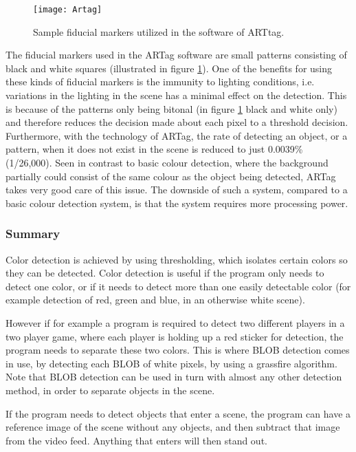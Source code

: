 \begin{figure}[!htbp]
\centering
\texttt{[image: Artag]}
\caption{Sample fiducial markers utilized in the software of ARTtag. \parencite{Fiala2005}}
\label{fig:artag}
\end{figure}

The fiducial markers used in the ARTag software are small patterns consisting of black and white squares (illustrated in figure \ref{fig:artag}).
One of the benefits for using these kinds of fiducial markers is the immunity to lighting conditions, i.e. variations in the lighting in the scene has a minimal effect on the detection. This is because of the patterns only being bitonal (in figure \ref{fig:artag} black and white only) and therefore reduces the decision made about each pixel to a threshold decision. 
Furthermore, with the technology of ARTag, the rate of detecting an object, or a pattern, when it does not exist in the scene is reduced to just 0.0039\% (1/26,000).
Seen in contrast to basic colour detection, where the background partially could consist of the same colour as the object being detected, ARTag takes very good care of this issue. The downside of such a system, compared to a basic colour detection system, is that the system requires more processing power.


\subsubsection{Summary}
Color detection is achieved by using thresholding, which isolates certain colors so they can be detected. Color detection is useful if the program only needs to detect one color, or if it needs to detect more than one easily detectable color (for example detection of red, green and blue, in an otherwise white scene).

However if for example a program is required to detect two different players in a two player game, where each player is holding up a red sticker for detection, the program needs to separate these two colors. This is where BLOB detection comes in use, by detecting each BLOB of white pixels, by using a grassfire algorithm. Note that BLOB detection can be used in turn with almost any other detection method, in order to separate objects in the scene.

If the program needs to detect objects that enter a scene, the program can have a reference image of the scene without any objects, and then subtract that image from the video feed. Anything that enters will then stand out. \parencite{Moeslund2012}
